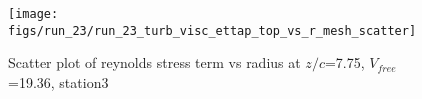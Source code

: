 \begin{figure}[H]
\centering
\texttt{[image: figs/run\_23/run\_23\_turb\_visc\_ettap\_top\_vs\_r\_mesh\_scatter]}
\caption{Scatter plot of reynolds stress term vs radius at $z/c$=7.75, $V_{free}$=19.36, station3}
\label{fig:run_23_turb_visc_ettap_top_vs_r_mesh_scatter}
\end{figure}


